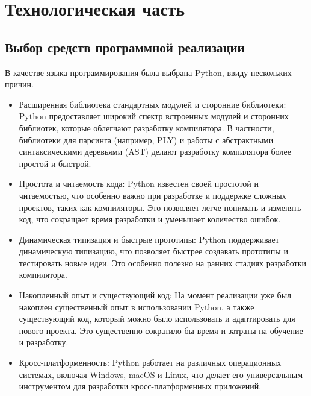 \chapter{Технологическая часть}
\section{Выбор средств программной реализации}
В качестве языка программирования была выбрана Python, ввиду нескольких причин.
\begin{itemize}[label = ---]
    \item Расширенная библиотека стандартных модулей и сторонние библиотеки: Python предоставляет широкий спектр встроенных модулей и сторонних библиотек, которые облегчают разработку компилятора. В частности, библиотеки для парсинга (например, PLY) и работы с абстрактными синтаксическими деревьями (AST) делают разработку компилятора более простой и быстрой.
    \item Простота и читаемость кода: Python известен своей простотой и читаемостью, что особенно важно при разработке и поддержке сложных проектов, таких как компиляторы. Это позволяет легче понимать и изменять код, что сокращает время разработки и уменьшает количество ошибок.
    \item Динамическая типизация и быстрые прототипы: Python поддерживает динамическую типизацию, что позволяет быстрее создавать прототипы и тестировать новые идеи. Это особенно полезно на ранних стадиях разработки компилятора.
    \item Накопленный опыт и существующий код: На момент реализации уже был накоплен существенный опыт в использовании Python, а также существующий код, который можно было использовать и адаптировать для нового проекта. Это существенно сократило бы время и затраты на обучение и разработку.
    \item Кросс-платформенность: Python работает на различных операционных системах, включая Windows, macOS и Linux, что делает его универсальным инструментом для разработки кросс-платформенных приложений.
\end{itemize}
\clearpage
